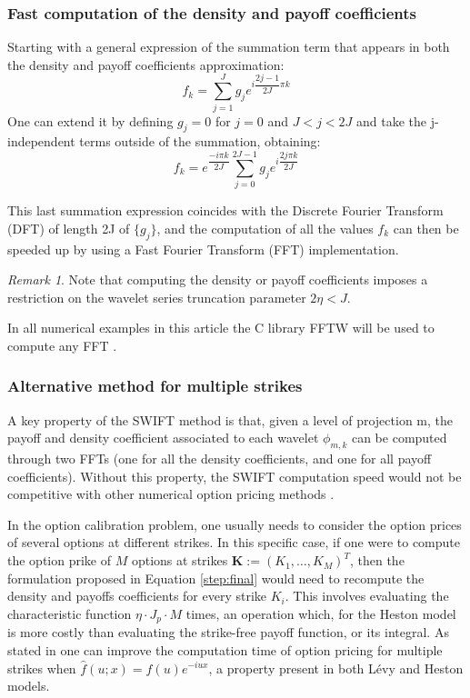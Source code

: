 \documentclass[12,twoside]{mammeTFM}
\theoremstyle{definition}
\theoremstyle{remark}
\newtheorem{remark}[thm]{Remark}
\begin{document}
\subsubsection{Fast computation of the density and payoff coefficients} \label{subsec:fft}
Starting with a general expression of the summation term that appears in both the density and payoff coefficients approximation:
\begin{equation}
f_k = \sum_{j=1}^J g_j e^{i \dfrac{2j - 1}{2J}\pi k}
\end{equation}
One can extend it by defining $g_j = 0$ for $j = 0$ and $J < j < 2J$ and take the j-independent terms outside of the summation, obtaining:
\begin{equation}
f_k = e^{\dfrac{-i \pi k}{2J}}\sum_{j=0}^{2J - 1} g_j e^{i \dfrac{2j\pi k}{2J}}
\end{equation}

This last summation expression coincides with the Discrete Fourier Transform (DFT) of length 2J of $\{g_j\}$, and the computation of all the values $f_k$ can then be speeded up by using a Fast Fourier Transform (FFT) implementation. 

\begin{remark}
Note that computing the density or payoff coefficients imposes a restriction on the wavelet series truncation parameter $2 \eta < J$.
\end{remark}

In all numerical examples in this article the C library FFTW will be used to compute any FFT \cite{fftw3}.

\subsubsection{Alternative method for multiple strikes}\label{subsec:multiple_strikes}
A key property of the SWIFT method is that, given a level of projection m, the payoff and density coefficient associated to each wavelet $\phi_{m,k}$ can be computed through two FFTs (one for all the density coefficients, and one for all payoff coefficients). Without this property, the SWIFT computation speed would not be competitive with other numerical option pricing methods \cite{flo20}.

In the option calibration problem, one usually needs to consider the option prices of several options at different strikes. In this specific case, if one were to compute the option prike of $M$ options at strikes $\boldsymbol{K} := (K_1, \ldots, K_M)^{T}$, then the formulation proposed in Equation \ref{step:final} would need to recompute the density and payoffs coefficients for every strike $K_i$. This involves evaluating the characteristic function $\eta \cdot J_p \cdot M$ times, an operation which, for the Heston model is more costly than evaluating the strike-free payoff function, or its integral. As stated in \cite{Ortiz-Gracia2016} one can improve the computation time of option pricing for multiple strikes when $\hat{f}(u; x) = \hat{f}(u) e^{-iux}$, a property present in both L\'evy and Heston models.
\end{document}
